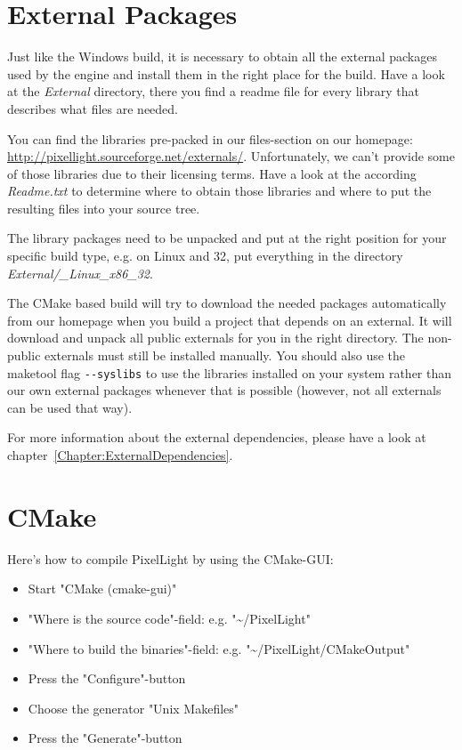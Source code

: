 \section{External Packages}
\label{Chapter:Linux_ExternalPackages}
Just like the Windows build, it is necessary to obtain all the external packages used by the engine and install them in the right place for the build. Have a look at the \emph{External} directory, there you find a readme file for every library that describes what files are needed.

You can find the libraries pre-packed in our files-section on our homepage: \url{http://pixellight.sourceforge.net/externals/}. Unfortunately, we can't provide some of those libraries due to their licensing terms. Have a look at the according \emph{Readme.txt} to determine where to obtain those libraries and where to put the resulting files into your source tree.

The library packages need to be unpacked and put at the right position for your specific build type, e.g. on Linux and \SI{32}{\bit}, put everything in the directory \emph{External/\_Linux\_x86\_32}.

The CMake based build will try to download the needed packages automatically from our homepage when you build a project that depends on an external. It will download and unpack all public externals for you in the right directory. The non-public externals must still be installed manually. You should also use the maketool flag \verb+--syslibs+ to use the libraries installed on your system rather than our own external packages whenever that is possible (however, not all externals can be used that way).

For more information about the external dependencies, please have a look at chapter~\ref{Chapter:ExternalDependencies}.




\section{CMake}
\label{Chapter:Linux_CMake}
Here's how to compile PixelLight by using the CMake-\ac{GUI}:
\begin{itemize}
\item{Start "CMake (cmake-gui)"}
\item{"Where is the source code"-field: e.g. "\textasciitilde /PixelLight"}
\item{"Where to build the binaries"-field: e.g. "\textasciitilde /PixelLight/CMakeOutput"}
\item{Press the "Configure"-button}
\item{Choose the generator "Unix Makefiles"}
\item{Press the "Generate"-button}
\end{itemize}

